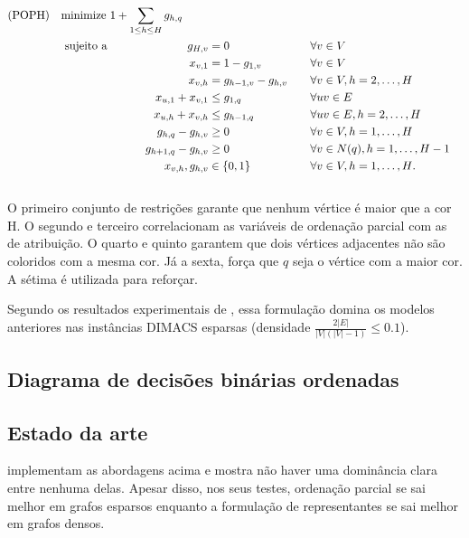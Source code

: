 \documentclass[11pt]{article}
\begin{document}
\begin{alignat*}
\mathrm { (POPH) } \quad & \omit\rlap{minimize  $\displaystyle 1+\sum_{1 \leq h \leq H} g_{h, q}$} \\
& \mbox { sujeito a } && \quad & g_{H, v} &=0          & \quad & \forall v \in V \\
&                     &&   & x_{v, 1} &=1-g_{1, v} & \quad & \forall v \in V \\
&                     &&   & x_{v, h} &=g_{h-1, v}-g_{h, v} & \quad & \forall v \in V, h=2, \ldots, H \\
&                     &&   & x_{u, 1}+x_{v, 1} &\leq g_{1, q} & \quad & \forall u v \in E \\
&                     &&   & x_{u, h}+x_{v, h} &\leq g_{h-1, q} & \quad & \forall u v \in E, h=2, \ldots, H \\
&                     &&   & g_{h, q}-g_{h, v} &\geq 0 & \quad & \forall v \in V, h=1, \ldots, H \\
&                     &&   & g_{h+1, q}-g_{h, v} &\geq 0 & \quad & \forall v \in N(q), h=1, \ldots, H-1 \\
&                     &&   & x_{v, h}, g_{h, v} &\in\{0,1\} & \quad & \forall v \in V, h=1, \ldots, H \text {. } \\
&                     &&   &
\end{alignat*}
O primeiro conjunto de restrições garante que nenhum vértice é maior que a cor H.
O segundo e terceiro correlacionam as variáveis de ordenação parcial com as de atribuição.
O quarto e quinto garantem que dois vértices adjacentes não são coloridos com a mesma cor.
Já a sexta, força que \(q\) seja o vértice com a maior cor.
A sétima é utilizada para reforçar.

Segundo os resultados experimentais de \autocite{Jabrayilov2022StrengthenedPartialOrdering}, essa formulação domina os modelos anteriores nas instâncias DIMACS \autocite{GraphColoringInstances} esparsas (densidade \(\frac{2|E|}{|V|(|V|-1)} \leq 0.1\)).

\subsection{Diagrama de decisões binárias ordenadas}
\label{sec:org4f68ac9}
\autocite{Hoeve2021Graphcoloringdecision}
\subsection{Estado da arte}
\label{sec:org005a0e9}
\textcite{Jabrayilov2018NewIntegerLinear} implementam as abordagens acima e mostra não haver uma dominância clara entre nenhuma delas.
Apesar disso, nos seus testes, ordenação parcial se sai melhor em grafos esparsos enquanto a formulação de representantes se sai melhor em grafos densos.
\end{document}
